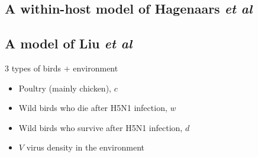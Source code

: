 \documentclass[aspectratio=43]{beamer}
\begin{document}
\subsection{A within-host model of Hagenaars \emph{et al}}


\subsection{A model of Liu \emph{et al}}

\begin{frame}{3 types of birds $+$ environment}
  \begin{itemize}
    \item Poultry (mainly chicken), $c$
    \item Wild birds who die after H5N1 infection, $w$
    \item Wild birds who survive after H5N1 infection, $d$
    \item $V$ virus density in the environment
  \end{itemize}
\end{frame}
\end{document}
